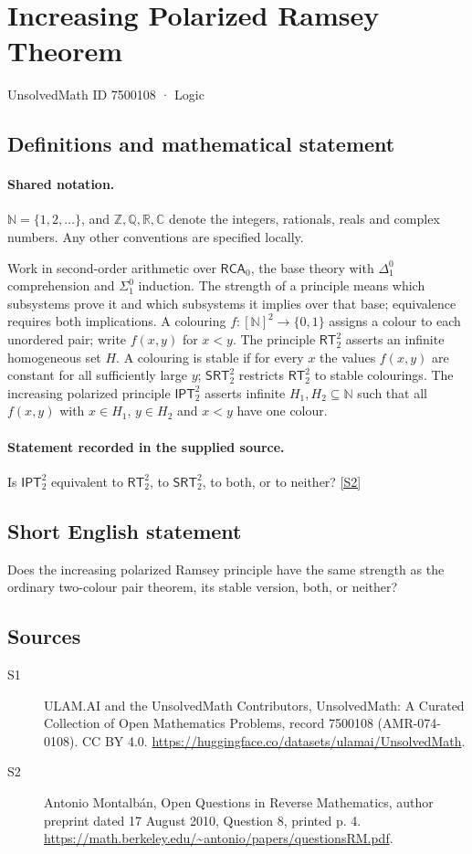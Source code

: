 \documentclass[11pt]{article}
\newcommand{\sref}[2]{\hyperlink{source:#1:#2}{[S#2]}}
\begin{document}
\setcounter{section}{7500107}
\section{Increasing Polarized Ramsey Theorem}\label{7500108}
{\small\sffamily UnsolvedMath ID 7500108 · Logic}
\subsection{Definitions and mathematical statement}

\paragraph{Shared notation.}$\mathbb N=\{1,2,\ldots\}$, and $\mathbb Z,\mathbb Q,\mathbb R,\mathbb C$ denote the integers, rationals, reals and complex numbers. Any other conventions are specified locally.


Work in second-order arithmetic over $\mathsf{RCA}_0$, the base theory with $\Delta^0_1$ comprehension and $\Sigma^0_1$ induction. The strength of a principle means which subsystems prove it and which subsystems it implies over that base; equivalence requires both implications. A colouring $f:[\mathbb N]^2\to\{0,1\}$ assigns a colour to each unordered pair; write $f(x,y)$ for $x<y$. The principle $\mathsf{RT}^2_2$ asserts an infinite homogeneous set $H$. A colouring is stable if for every $x$ the values $f(x,y)$ are constant for all sufficiently large $y$; $\mathsf{SRT}^2_2$ restricts $\mathsf{RT}^2_2$ to stable colourings. The increasing polarized principle $\mathsf{IPT}^2_2$ asserts infinite $H_1,H_2\subseteq\mathbb N$ such that all $f(x,y)$ with $x\in H_1$, $y\in H_2$ and $x<y$ have one colour.
\paragraph{Statement recorded in the supplied source.}
Is $\mathsf{IPT}^2_2$ equivalent to $\mathsf{RT}^2_2$, to $\mathsf{SRT}^2_2$, to both, or to neither? \sref{7500108}{2}
\subsection{Short English statement}
Does the increasing polarized Ramsey principle have the same strength as the ordinary two-colour pair theorem, its stable version, both, or neither?
\subsection{Sources}
\begin{description}
\item[\hypertarget{source:7500108:1}{S1}] ULAM.AI and the UnsolvedMath Contributors, UnsolvedMath: A Curated Collection of Open Mathematics Problems, record 7500108 (AMR-074-0108). CC BY 4.0. \url{https://huggingface.co/datasets/ulamai/UnsolvedMath}.
\item[\hypertarget{source:7500108:2}{S2}] Antonio Montalbán, Open Questions in Reverse Mathematics, author preprint dated 17 August 2010, Question 8, printed p. 4. \url{https://math.berkeley.edu/~antonio/papers/questionsRM.pdf}.
\end{description}
\label{end:7500108}
\end{document}
